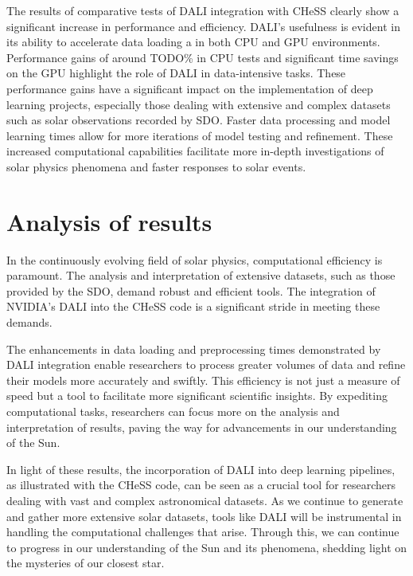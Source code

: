 \documentclass[licencjacka,en]{pracamgr}
\begin{document}
The results of comparative tests of DALI integration with CHeSS clearly show a significant increase in performance and efficiency. DALI's usefulness is evident in its ability to accelerate data loading a in both CPU and GPU environments. 
Performance gains of around TODO\% in CPU tests and significant time savings on the GPU highlight the role of DALI in data-intensive tasks.  These performance gains have a significant impact on the implementation of deep learning projects, especially those dealing with extensive and complex datasets such as solar observations recorded by SDO. Faster data processing and model learning times allow for more iterations of model testing and refinement. These increased computational capabilities facilitate more in-depth investigations of solar physics phenomena and faster responses to solar events.

\section{Analysis of results}

In the continuously evolving field of solar physics, computational efficiency is paramount. The analysis and interpretation of extensive datasets, such as those provided by the SDO, demand robust and efficient tools. The integration of NVIDIA's DALI into the CHeSS code is a significant stride in meeting these demands.

The enhancements in data loading and preprocessing times demonstrated by DALI integration enable researchers to process greater volumes of data and refine their models more accurately and swiftly. This efficiency is not just a measure of speed but a tool to facilitate more significant scientific insights. By expediting computational tasks, researchers can focus more on the analysis and interpretation of results, paving the way for advancements in our understanding of the Sun.

In light of these results, the incorporation of DALI into deep learning pipelines, as illustrated with the CHeSS code, can be seen as a crucial tool for researchers dealing with vast and complex astronomical datasets. As we continue to generate and gather more extensive solar datasets, tools like DALI will be instrumental in handling the computational challenges that arise. Through this, we can continue to progress in our understanding of the Sun and its phenomena, shedding light on the mysteries of our closest star.

\end{document}
